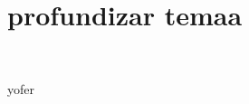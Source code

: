 \section{profundizar temaa} 
\textbf{}\\
\begin{flushleft}


\begin{itemize}



yofer
	


\end{itemize} 


\end{flushleft}


